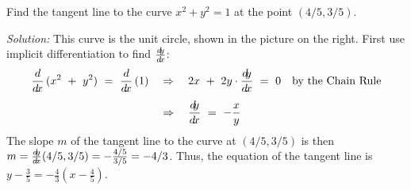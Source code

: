 \newpage
\begin{exmp}\label{exmp:implicitcir}
\noindent Find the tangent line to the curve $x^2 + y^2 = 1$ at the point
$(4/5,3/5)$.\vspace{1mm}
\par\noindent\emph{Solution:} This curve is the unit circle, shown in the
picture on the right. First use implicit differentiation to find $\frac{d\negmedspace y}{d\!x}$:
\begin{align*}
\frac{d}{d\!x}\,(x^2 ~+~ y^2) ~=~ \frac{d}{d\!x}\,(1) \quad&\Rightarrow\quad
2x ~+~ 2y \cdot \frac{d\negmedspace y}{d\!x} ~=~ 0 \quad\text{by the Chain Rule}\\[4pt]
&\Rightarrow\quad \frac{d\negmedspace y}{d\!x} ~=~ -\frac{x}{y}
\end{align*}\vspace{-7mm}
\noindent The slope $m$ of the tangent line to the curve at $(4/5,3/5)$ is then
$m = \frac{d\negmedspace y}{d\!x}(4/5,3/5) = -\frac{4/5}{3/5} = -4/3$. Thus, the equation of the
tangent line is $y - \frac{3}{5} = -\frac{4}{3}\left(x - \frac{4}{5}\right)$.
\end{exmp}\vspace{-2mm}
\divider
\vspace{3mm}

